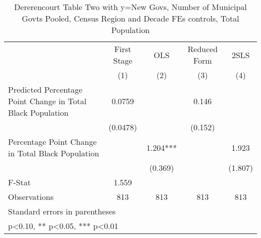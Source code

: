 \begin{table}[htbp]\centering
\def\sym#1{\ifmmode^{#1}\else\(^{#1}\)\fi}
\caption{Dererencourt Table Two with y=New Govs, Number of Municipal Govts  Pooled, Census Region and Decade FEs controls, Total Population}
\begin{tabular}{l*{4}{c}}
\toprule
                    & First Stage   &         OLS   &Reduced Form   &        2SLS   \\
                    &\multicolumn{1}{c}{(1)}   &\multicolumn{1}{c}{(2)}   &\multicolumn{1}{c}{(3)}   &\multicolumn{1}{c}{(4)}   \\
\midrule
Predicted Percentage Point Change in Total Black Population&      0.0759   &               &       0.146   &               \\
                    &    (0.0478)   &               &     (0.152)   &               \\
\addlinespace
Percentage Point Change in Total Black Population&               &       1.204***&               &       1.923   \\
                    &               &     (0.369)   &               &     (1.807)   \\
\midrule
F-Stat              &       1.559   &               &               &               \\
Observations        &         813   &         813   &         813   &         813   \\
\bottomrule
\multicolumn{5}{l}{\footnotesize Standard errors in parentheses}\\
\multicolumn{5}{l}{\footnotesize * p<0.10, ** p<0.05, *** p<0.01}\\
\end{tabular}
\end{table}

